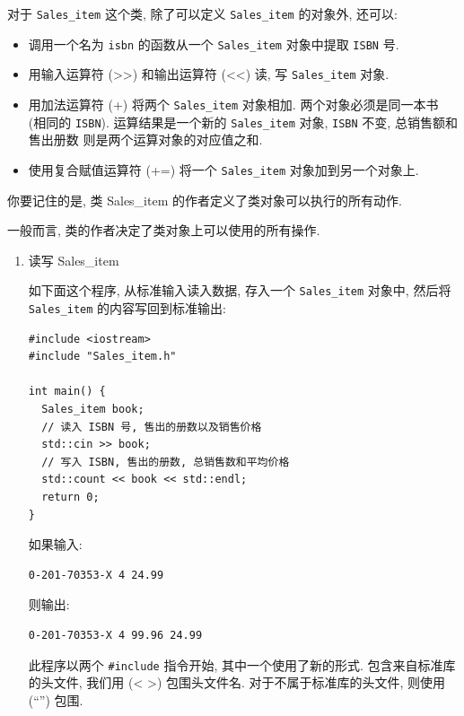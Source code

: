 \documentclass[lang=cn]{elegantbook}
\begin{document}
对于 \texttt{Sales\_item} 这个类, 除了可以定义 \texttt{Sales\_item} 的对象外, 还可以:

\begin{itemize}
\item 调用一个名为 \texttt{isbn} 的函数从一个 \texttt{Sales\_item} 对象中提取 \texttt{ISBN} 号.
\item 用输入运算符 (>>) 和输出运算符 (<<) 读, 写 \texttt{Sales\_item} 对象.
\item 用加法运算符 (+) 将两个 \texttt{Sales\_item} 对象相加. 两个对象必须是同一本书 (相同的
\texttt{ISBN}). 运算结果是一个新的 \texttt{Sales\_item} 对象, \texttt{ISBN} 不变, 总销售额和售出册数
则是两个运算对象的对应值之和.
\item 使用复合赋值运算符 (+=) 将一个 \texttt{Sales\_item} 对象加到另一个对象上.
\end{itemize}

\vspace*{1\baselineskip}
\begin{definition}[类定义了行为]
你要记住的是, 类 Sales\_item 的作者定义了类对象可以执行的所有动作.

一般而言, 类的作者决定了类对象上可以使用的所有操作.
\end{definition}

\begin{enumerate}
\item 读写 Sales\_item
\label{sec:org262748e}

如下面这个程序, 从标准输入读入数据, 存入一个 \texttt{Sales\_item} 对象中, 然后将
\texttt{Sales\_item} 的内容写回到标准输出:

\begin{verbatim}
#include <iostream>
#include "Sales_item.h"

int main() {
  Sales_item book;
  // 读入 ISBN 号, 售出的册数以及销售价格
  std::cin >> book;
  // 写入 ISBN, 售出的册数, 总销售数和平均价格
  std::count << book << std::endl;
  return 0;
}
\end{verbatim}

如果输入:

\begin{verbatim}
0-201-70353-X 4 24.99
\end{verbatim}

则输出:
\begin{verbatim}
0-201-70353-X 4 99.96 24.99
\end{verbatim}

此程序以两个 \texttt{\#include} 指令开始, 其中一个使用了新的形式. 包含来自标准库的头文件,
我们用 (< >) 包围头文件名. 对于不属于标准库的头文件, 则使用 (``'') 包围.

\vspace*{1\baselineskip}
\end{enumerate}
\end{document}
